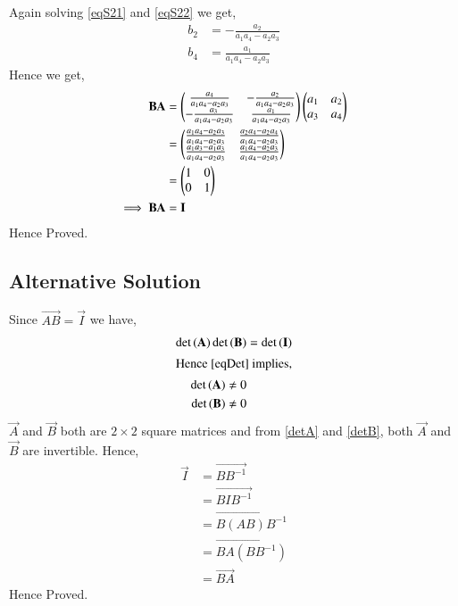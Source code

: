 \documentclass[journal,12pt,twocolumn]{IEEEtran}
\begin{document}
Again solving \eqref{eqS21} and \eqref{eqS22} we get,
\begin{align}
b_2 &= -\frac{a_2}{a_1a_4-a_2a_3}\label{sol3}\\
b_4 &= \frac{a_1}{a_1a_4-a_2a_3}\label{sol4}
\end{align}
Hence we get,
\begin{align}
\vec{BA} &= \myvec{\frac{a_4}{a_1a_4-a_2a_3}&-\frac{a_2}{a_1a_4-a_2a_3}\\-\frac{a_3}{a_1a_4-a_2a_3}&\frac{a_1}{a_1a_4-a_2a_3}}\myvec{a_1&a_2\\a_3&a_4}\\
&= \myvec{\frac{a_1a_4-a_2a_3}{a_1a_4-a_2a_3}&\frac{a_2a_4-a_2a_4}{a_1a_4-a_2a_3}\\\frac{a_1a_3-a_1a_3}{a_1a_4-a_2a_3}&\frac{a_1a_4-a_2a_3}{a_1a_4-a_2a_3}}\\
&= \myvec{1&0\\0&1}\\
\implies\vec{BA}&=\vec{I}
\end{align}
Hence Proved.
\subsection{Alternative Solution}
Since $\vec{AB} = \vec{I}$ we have,
\begin{align}
\det{(\vec{A})}\det{(\vec{B})} &= \det{(\vec{I})}\label{eqDet}\\
\intertext{Hence \eqref{eqDet} implies,}
\det{(\vec{A})} \not= 0\label{detA}\\
\det{(\vec{B})} \not= 0\label{detB}
\end{align}
$\vec{A}$ and $\vec{B}$ both are $2 \times 2$  square matrices and from \eqref{detA} and \eqref{detB}, both $\vec{A}$ and $\vec{B}$ are invertible. Hence,
\begin{align}
\vec{I}&=\vec{BB^{-1}}\\
&=\vec{BIB^{-1}}\\
&=\vec{B(AB)B^{-1}}\\
&=\vec{BA(BB^{-1})}\\
&=\vec{BA}
\end{align}
Hence Proved.
\end{document}
